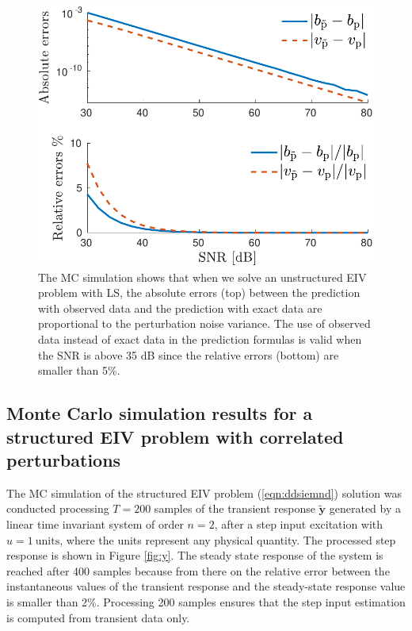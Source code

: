 \begin{figure}[htb!]
  \centering
  \includegraphics[width=1\columnwidth]{./ChapterStatisticalAnalysis/fig/Fig_4.pdf} 
  \caption{ \label{fig:bv_btvt_abse_rele_unstr_e7} The MC simulation shows that when we solve an unstructured EIV problem with LS, the absolute errors (top) between the prediction with observed data and the prediction with exact data are proportional to the perturbation noise variance. The use of observed data instead of exact data in the prediction formulas is valid when the SNR is above 35 dB since the relative errors (bottom) are smaller than 5\%. } 
\end{figure}


\subsection{Monte Carlo simulation results for a structured EIV problem with correlated perturbations}

The MC simulation of the structured EIV problem (\ref{eqn:ddsiemnd}) solution was conducted processing $T = 200$ samples of the transient response $\widetilde{\mathbf{y}}$ generated by a linear time invariant system of order $n = 2$, after a step input excitation with $u = 1 \ \mathrm{units}$, where the units represent any physical quantity. 
The processed step response is shown in Figure \ref{fig:y}.
The steady state response of the system is reached after 400 samples because from there on the relative error between the instantaneous values of the transient response and the steady-state response value is smaller than 2\%.
Processing 200 samples ensures that the step input estimation is computed from transient data only.


